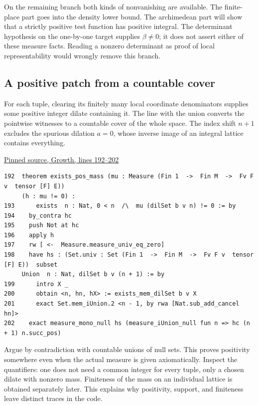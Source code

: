\documentclass[12pt,letterpaper]{article}
\begin{document}
On the remaining branch both kinds of nonvanishing are available. The finite-place part goes into the density lower bound. The archimedean part will show that a strictly positive test function has positive integral. The determinant hypothesis on the one-by-one target supplies \(\beta\ne0\); it does not assert either of these measure facts. Reading a nonzero determinant as proof of local representability would wrongly remove this branch.

\clearpage\subsection*{A positive patch from a countable cover}

For each tuple, clearing its finitely many local coordinate denominators supplies some positive integer dilate containing it. The line with the union converts the pointwise witnesses to a countable cover of the whole space. The index shift \(n+1\) excludes the spurious dilation \(a=0\), whose inverse image of an integral lattice contains everything.

\par\smallskip\href{https://github.com/nousentllc/riemann-hypothesis/blob/40e56bab026552e089d7afcfeff08d2defb9c005/src/CompanionTheory/SpectralGeometry/LocalGlobalProofs/AdelicAnalysis/RankOneLocalDensitiesProductConverges.lean#L192-L202}{\sffamily\small Pinned source, Growth, lines 192--202}\par

{\footnotesize\begin{verbatim}
192  theorem exists_pos_mass (mu : Measure (Fin 1  ->  Fin M  ->  Fv F v  tensor [F] E))
     (h : mu != 0) :
193      exists  n : Nat, 0 < n  /\  mu (dilSet b v n) != 0 := by
194    by_contra hc
195    push Not at hc
196    apply h
197    rw [ <-  Measure.measure_univ_eq_zero]
198    have hs : (Set.univ : Set (Fin 1  ->  Fin M  ->  Fv F v  tensor [F] E))  subset
     Union  n : Nat, dilSet b v (n + 1) := by
199      intro X _
200      obtain <n, hn, hX> := exists_mem_dilSet b v X
201      exact Set.mem_iUnion.2 <n - 1, by rwa [Nat.sub_add_cancel hn]>
202    exact measure_mono_null hs (measure_iUnion_null fun n => hc (n + 1) n.succ_pos)
\end{verbatim}
}

Argue by contradiction with countable unions of null sets. This proves positivity somewhere even when the actual measure is given axiomatically. Inspect the quantifiers: one does not need a common integer for every tuple, only a chosen dilate with nonzero mass. Finiteness of the mass on an individual lattice is obtained separately later. This explains why positivity, support, and finiteness leave distinct traces in the code.
\end{document}
